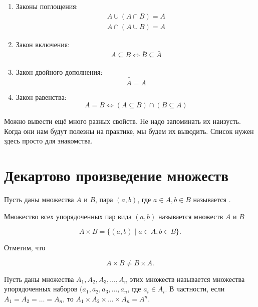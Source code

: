 \documentclass[12pt, a4paper]{article}
\begin{document}
\begin{enumerate}
    \item Законы поглощения:
    \begin{equation}
        \begin{aligned} 
            A \cup (A \cap B) = A \\
            A \cap (A \cup B) = A
        \end{aligned}
    \end{equation}
    
    \item Закон включения:
    \begin{equation}
        \begin{aligned} 
            A \subseteq B \Leftrightarrow \bar{B} \subseteq \bar{A}
        \end{aligned}
    \end{equation}
    
    \item Закон двойного дополнения:
        \[\bar{\bar{A}} = A\]
        
    \item Закон равенства:
        \[A = B \Leftrightarrow (A \subseteq B) \cap (B \subseteq A)\]
\end{enumerate}    

Можно вывести ещё много разных свойств. Не надо запоминать их наизусть. Когда они нам будут полезны на практике, мы будем их выводить. Список нужен здесь просто для знакомства.

\section{Декартово произведение множеств}

\begin{mydef}
Пусть даны множества $A$ и $B$, пара $(a, b)$, где $a \in A, b \in B$ называется . 

Множество всех упорядоченных пар вида $(a, b)$ называется  множеств $A$ и $B$

\[A \times B = \{(a,b) \mid a \in A, b \in B\}.\]

Отметим, что 

\[A \times B \neq B \times A.\]
\end{mydef}

\begin{mydef}
Пусть даны множества $A_1, A_2, A_3, \ldots, A_n$  этих множеств называется множества упорядоченных наборов $(a_1, a_2, a_3, \ldots, a_n$, где $a_i \in A_i.$ В частности, если $A_1 = A_2 = \ldots = A_n$, то $A_1 \times A_2 \times \ldots \times A_n = A^n$.
\end{mydef}
\end{document}
